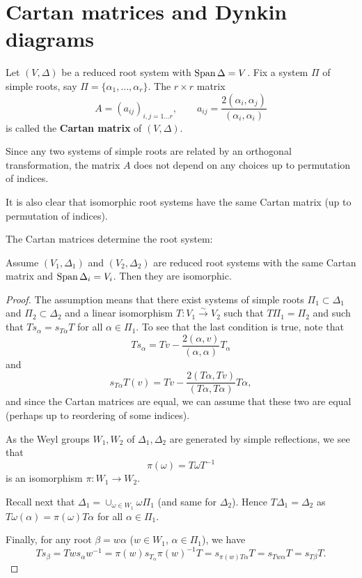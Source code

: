 \documentclass[11pt, english]{article}
\begin{document}
\newpage
\section{Cartan matrices and Dynkin diagrams}

Let $(V,\Delta)$ be a reduced root system with $\operatorname{Span} \Delta = V$. Fix a system $\Pi$ of simple roots, say $\Pi = \{ \alpha_1, \ldots, \alpha_r \}$. The $r \times r$ matrix 
$$
A = {(a_{ij})}_{i,j=1\ldots r}, \qquad a_{ij} = \frac{2(\alpha_i,\alpha_j)}{(\alpha_i,\alpha_i)}
$$
is called the \textbf{Cartan matrix} of $(V,\Delta)$.

Since any two systems of simple roots are related by an orthogonal transformation, the matrix $A$ does not depend on any choices up to permutation of indices.

It is also clear that isomorphic root systems have the same Cartan matrix (up to permutation of indices). 

The Cartan matrices determine the root system:

\begin{prop}
  Assume $(V_1,\Delta_1)$ and $(V_2,\Delta_2)$ are reduced root systems with the same Cartan matrix and $\operatorname{Span} \Delta_i=V_i$. Then they are isomorphic.
\end{prop}

\begin{proof}
 The assumption means that there exist systems of simple roots $\Pi_1 \subset \Delta_1$ and $\Pi_2 \subset \Delta_2$ and a linear isomorphism $T:V_1 \xrightarrow{\sim} V_2$ such that $T \Pi_1 = \Pi_2$ and such that $Ts_\alpha = s_{T \alpha} T$ for all $\alpha \in \Pi_1$. To see that the last condition is true, note that
$$
Ts_\alpha = Tv  -\frac{2(\alpha,v)}{(\alpha, \alpha)} T_\alpha
$$
and
$$
s_{T\alpha}T(v) = Tv - \frac{2(T\alpha,Tv)}{(T\alpha,T\alpha)} T\alpha,
$$
and since the Cartan matrices are equal, we can assume that these two are equal (perhaps up to reordering of some indices). 

As the Weyl groups $W_1, W_2$ of $\Delta_1, \Delta_2$ are generated by simple reflections, we see that 
$$
\pi(\omega ) = T \omega T^{-1}
$$
is an isomorphism $\pi:W_1 \to W_2$. 

Recall next that $\Delta_1 = \cup_{\omega \in W_1} \omega \Pi_1$ (and same for $\Delta_2$). Hence $T \Delta_1 = \Delta_2$ as $T\omega (\alpha) = \pi(\omega)T\alpha$ for all $\alpha \in \Pi_1$.

Finally, for any root $\beta=w\alpha$ ($w \in W_1$, $\alpha \in \Pi_1$), we have
$$
T  s_\beta = Tw s_\alpha w^{-1} = \pi(w) s_{T_\alpha} \pi(w)^{-1} T = s_{\pi(w)T\alpha} T = s_{Tw \alpha} T = s_{T\beta} T.
$$
\end{proof}
\end{document}
